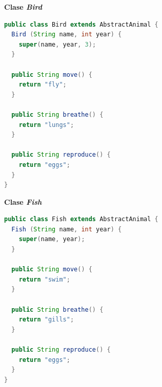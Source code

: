 \documentclass[11pt, twocolumn]{article}
\begin{document}
  \textbf{Clase \textit{Bird}}
  \begin{lstlisting}[language=Java]
public class Bird extends AbstractAnimal {
  Bird (String name, int year) {
    super(name, year, 3);
  }

  public String move() {
    return "fly";
  }

  public String breathe() {
    return "lungs";
  }

  public String reproduce() {
    return "eggs";
  }
}  
  \end{lstlisting}

  \textbf{Clase \textit{Fish}}
  \begin{lstlisting}[language=Java]
public class Fish extends AbstractAnimal {
  Fish (String name, int year) {
    super(name, year);
  }

  public String move() {
    return "swim";
  }

  public String breathe() {
    return "gills";
  }

  public String reproduce() {
    return "eggs";
  }
}  
  \end{lstlisting}
\end{document}
